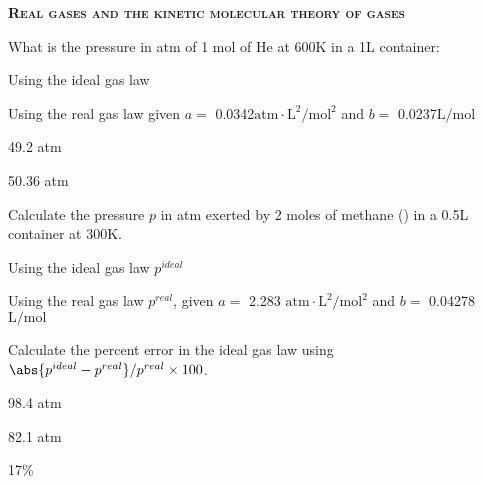 \documentclass[main.tex]{subfiles}
\begin{document}
\begin{multicols*}{2}
\begin{solution}
\hspace{0.1cm}\end{solution}%






{\raggedright\textsc{\textbf{Real gases and the kinetic molecular theory of gases }}\par}

\begin{question}[ID=\the\value{numA}]
What is the pressure in atm of 1 mol of He at 600K in a 1L container: 
\begin{inparaenum}[(a)]	
\item  Using the ideal gas law
\item  Using the real gas law given $a=$ 0.0342$\text{atm}\cdot \text{L}^2/\text{mol}^{2}$ and $b=$ 0.0237$\text{L/mol}$
\end{inparaenum} 
\end{question}
\begin{solution}
\begin{inparaenum}[(a)]	
\item  49.2 atm
\item  50.36 atm
\end{inparaenum} 
\hspace{0.1cm}\end{solution}%

\begin{question}[ID=\the\value{numA}]
Calculate the pressure $p$ in atm exerted by 2 moles of methane () in a 0.5L container at 300K. 
\begin{inparaenum}[(a)]	
\item  Using the ideal gas law $p^{ideal}$
\item  Using the real gas law $p^{real}$, given $a=$ 2.283 $\text{atm}\cdot \text{L}^2/\text{mol}^{2}$ and $b=$ 0.04278$\text{L/mol}$
\item Calculate the percent error in the ideal gas law using $\abs{p^{ideal}-p^{real}}/p^{real}\times 100$.
\end{inparaenum} 
\end{question}
\begin{solution}
\begin{inparaenum}[(a)]	
\item   98.4 atm
\item   82.1 atm
\item 17\%
\end{inparaenum} 
\hspace{0.1cm}\end{solution}%



\end{multicols*}
\end{document}
